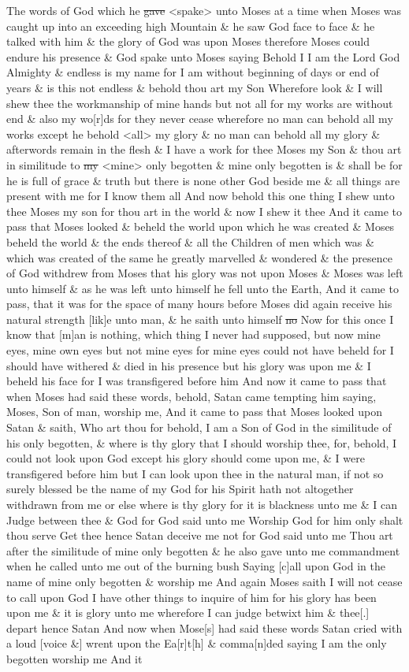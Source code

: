 				The words of God which he \sout{gave} <spake> unto Moses at a time when Moses was caught up into an exceeding high Mountain \& he saw God face to face \& he talked with him \& the glory of God was upon Moses therefore Moses could endure his presence \& God spake unto Moses saying Behold I I am the Lord God Almighty \& endless is my name for I am without beginning of days or end of years \& is this not endless \& behold thou art my Son Wherefore look \& I will shew thee the workmanship of mine hands but not all for my works are without end \& also my wo[r]ds for they never cease wherefore no man can behold all my works except he behold <all> my glory \& no man can behold all my glory \& afterwords remain in the flesh \& I have a work for thee Moses my Son \& thou art in similitude to \sout{my} <mine> only begotten \& mine only begotten is \& shall be for he is full of grace \& truth but there is none other God beside me \& all things are present with me for I know them all And now behold this one thing I shew unto thee Moses my son for thou art in the world \& now I shew it thee And it came to pass that Moses looked \& beheld the world upon which he was created \& Moses beheld the world \& the ends thereof \& all the Children of men which was \& which was created of the same he greatly marvelled \& wondered \& the presence of God withdrew from Moses that his glory was not upon Moses \& Moses was left unto himself \& as he was left unto himself he fell unto the Earth, And it came to pass, that it was for the space of many hours before Moses did again receive his natural strength [lik]e unto man, \& he saith unto himself \sout{no} Now for this once I know that [m]an is nothing, which thing I never had supposed, but now mine eyes, mine own eyes but not mine eyes for mine eyes could not have beheld for I should have withered \& died in his presence but his glory was upon me \& I beheld his face for I was transfigered before him And now it came to pass that when Moses had said these words, behold, Satan came tempting him saying, Moses, Son of man, worship me, And it came to pass that Moses looked upon Satan \& saith, Who art thou for behold, I am a Son of God in the similitude of his only begotten, \& where is thy glory that I should worship thee, for, behold, I could not look upon God except his glory should come upon me, \& I were transfigered before him but I can look upon thee in the natural man, if not so surely blessed be the name of my God for his Spirit hath not altogether withdrawn from me or else where is thy glory for it is blackness unto me \& I can Judge between thee \& God for God said unto me Worship God for him only shalt thou serve Get thee hence Satan deceive me not for God said unto me Thou art after the similitude of mine only begotten \& he also gave unto me commandment when he called unto me out of the burning bush Saying [c]all upon God in the name of mine only begotten \& worship me And again Moses saith I will not cease to call upon God I have other things to inquire of him for his glory has been upon me \& it is glory unto me wherefore I can judge betwixt him \& thee[.] depart hence Satan And now when Mose[s] had said these words Satan cried with a loud [voice \&] wrent upon the Ea[r]t[h] \& comma[n]ded saying I am the only begotten worship me And it 